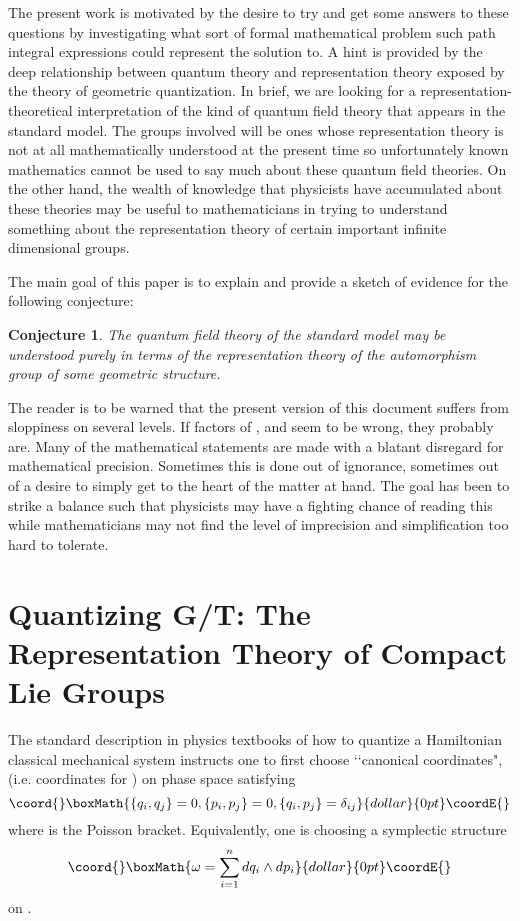 \documentclass[a4paper,a4paper]{article}
\theoremstyle{conjecture}
\newtheorem*{conjecture}{Conjecture}
\begin{document}
The present work is motivated by the desire to try and get some answers to these
questions by investigating what sort of formal mathematical problem
such path integral expressions could represent the solution to.  A hint is provided by the deep
relationship between quantum theory and representation theory exposed by the theory of geometric
quantization.  In brief, we are looking for a representation-theoretical interpretation of the
kind of quantum field theory that appears in the standard model. The groups involved will be
ones whose representation theory is not at all mathematically understood at the present time so
unfortunately known mathematics cannot be used to say much about these quantum field theories.
On the other hand, the wealth of knowledge that physicists have accumulated about these theories
may be useful to mathematicians in trying to understand something about the representation
theory of certain important infinite dimensional groups.

The main goal of this paper is to explain and provide a sketch of evidence for the following
conjecture:
\begin{conjecture}
The quantum field theory of the standard model may be understood purely in terms
of the representation theory of the automorphism group of some geometric
structure.
\end{conjecture}

The reader is to be warned that the present version of this document suffers from sloppiness
on several levels.  If factors of \coordHE{}, \myHighlight{$\pi$}\coordHE{} and \coordHE{} seem to be wrong, they probably are.
Many of the mathematical statements are made with a blatant disregard for mathematical precision.
Sometimes this is done out of ignorance, sometimes out of a  desire to simply get to
the heart of the matter at hand.  The goal has been to strike a balance such that physicists may
have a fighting chance of reading this while mathematicians may not find the level of imprecision 
and simplification too hard to tolerate.

\section{Quantizing G/T: The Representation Theory of Compact Lie Groups}


The standard description in physics textbooks of how to quantize a
Hamiltonian classical mechanical system instructs one to first
choose \lq\lq canonical coordinates", (i.e. coordinates \coordHE{} for \coordHE{}) on phase space
\coordHE{} satisfying
$$\coord{}\boxMath{\{q_i, q_j\}=0, \{p_i,p_j\}=0, \{q_i,p_j\}=\delta_{ij}}{dollar}{0pt}\coordE{}$$
where \myHighlight{$\{\cdot,\cdot\}$}\coordHE{} is the Poisson bracket. Equivalently, one is choosing a
symplectic structure
$$\coord{}\boxMath{\omega=\sum_{i=1}^n dq_i\wedge dp_i}{dollar}{0pt}\coordE{}$$
on \coordHE{}.
\end{document}
